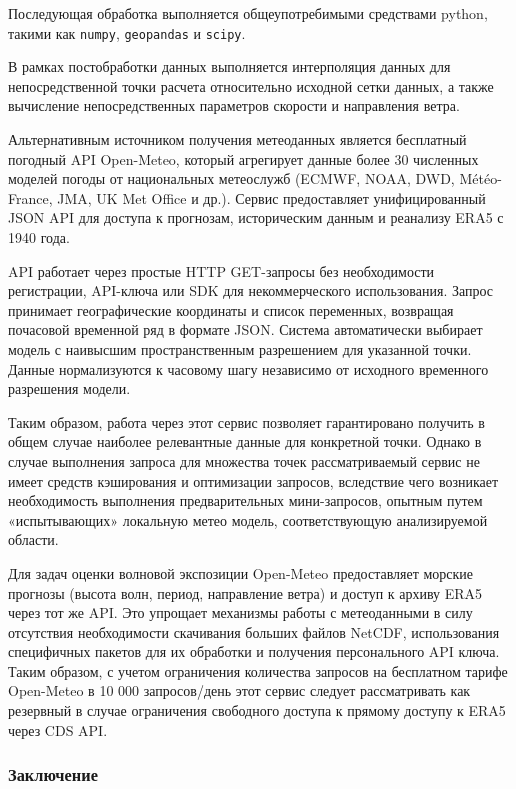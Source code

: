 Последующая обработка выполняется общеупотребимыми средствами python, такими как \texttt{numpy}, \texttt{geopandas} и \texttt{scipy}.

В рамках постобработки данных выполняется интерполяция данных для непосредственной точки расчета относительно исходной сетки данных, а также вычисление непосредственных параметров скорости и направления ветра.

Альтернативным источником получения метеоданных является бесплатный погодный API Open-Meteo, который агрегирует данные более 30 численных моделей погоды от национальных метеослужб (ECMWF, NOAA, DWD, Météo-France, JMA, UK Met Office и др.).
Сервис предоставляет унифицированный JSON API для доступа к прогнозам, историческим данным и реанализу ERA5 с 1940 года.

API работает через простые HTTP GET-запросы без необходимости регистрации, API-ключа или SDK для некоммерческого использования. 
Запрос принимает географические координаты и список переменных, возвращая почасовой временной ряд в формате JSON. 
Система автоматически выбирает модель с наивысшим пространственным разрешением для указанной точки. 
Данные нормализуются к часовому шагу независимо от исходного временного разрешения модели.

Таким образом, работа через этот сервис позволяет гарантировано получить в общем случае наиболее релевантные данные для конкретной точки.
Однако в случае выполнения запроса для множества точек рассматриваемый сервис не имеет средств кэширования и оптимизации запросов, вследствие чего возникает необходимость выполнения предварительных мини-запросов, опытным путем «испытывающих» локальную метео модель, соответствующую анализируемой области.

Для задач оценки волновой экспозиции Open-Meteo предоставляет морские прогнозы (высота волн, период, направление ветра) и доступ к архиву ERA5 через тот же API. 
Это упрощает механизмы работы с метеоданными в силу отсутствия  необходимости скачивания больших файлов NetCDF, использования специфичных пакетов для их обработки и получения персонального API ключа.
Таким образом, с учетом ограничения количества запросов на бесплатном тарифе Open-Meteo в 10 000 запросов/день этот сервис следует рассматривать как резервный в случае ограничения свободного доступа к прямому доступу к ERA5 через CDS API.

\subsubsection{Заключение}

